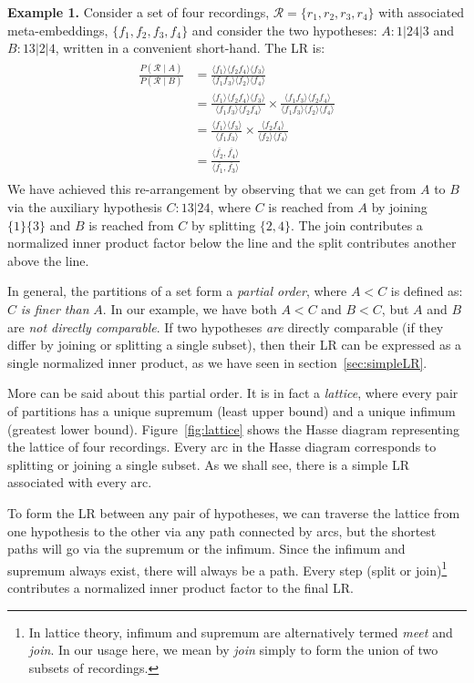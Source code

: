 \documentclass[a4paper,oneside,12pt,english]{report}
\def\expv#1#2{\bigl\langle#1\bigr\rangle_{#2}}
\def\expp#1{\bigl\langle#1\bigr\rangle}
\def\Rset{\mathcal{R}}
\def\dot#1#2{\expv{#1,#2}{}}
\def\normal#1{\overline{#1}}
\def\dotn#1#2{\dot{\normal{#1}}{\normal{#2}}}
\begin{document}
\noindent\textbf{Example 1.} Consider a set of four recordings, $\Rset=\{r_1,r_2,r_3,r_4\}$ with associated meta-embeddings, $\{f_1,f_2,f_3,f_4\}$ and consider the two hypotheses: $A:1|24|3$ and $B:13|2|4$, written in a convenient short-hand. The LR is:
\begin{align}
\begin{split}
\frac{P(\Rset\mid A)}{P(\Rset\mid B)} &= \frac{\expp{f_1}\expp{f_2f_4}\expp{f_3}}{\expp{f_1f_3}\expp{f_2}\expp{f_4}}\\
&= \frac{\expp{f_1}\expp{f_2f_4}\expp{f_3}}{\expp{f_1f_3}\expp{f_2f_4}}\times
\frac{\expp{f_1f_3}\expp{f_2f_4}}{\expp{f_1f_3}\expp{f_2}\expp{f_4}} \\
&= \frac{\expp{f_1}\expp{f_3}}{\expp{f_1f_3}}\times
\frac{\expp{f_2f_4}}{\expp{f_2}\expp{f_4}} \\
&= \frac{\dotn{f_2}{f_4}}{\dotn{f_1}{f_3}}
\end{split}
\end{align} 
We have achieved this re-arrangement by observing that we can get from $A$ to $B$ via the auxiliary hypothesis $C:13|24$, where $C$ is reached from $A$ by joining $\{1\}\{3\}$ and $B$ is reached from $C$ by splitting $\{2,4\}$. The join contributes a normalized inner product factor below the line and the split contributes another above the line.

In general, the partitions of a set form a \emph{partial order}, where $A<C$ is defined as: $C$ \emph{is finer than} $A$. In our example, we have both $A<C$ and $B<C$, but $A$ and $B$ are \emph{not directly comparable}. If two hypotheses \emph{are} directly comparable (if they differ by joining or splitting a single subset), then their LR can be expressed as a single normalized inner product, as we have seen in section~\ref{sec:simpleLR}. 

More can be said about this partial order. It is in fact a \emph{lattice}, where every pair of partitions has a unique supremum (least upper bound) and a unique infimum (greatest lower bound). Figure~\ref{fig:lattice} shows the Hasse diagram representing the lattice of four recordings. Every arc in the Hasse diagram corresponds to splitting or joining a single subset. As we shall see, there is a simple LR associated with every arc. 

To form the LR between any pair of hypotheses, we can traverse the lattice from one hypothesis to the other via any path connected by arcs, but the shortest paths will go via the supremum or the infimum. Since the infimum and supremum always exist, there will always be a path. Every step (split or join)\footnote{In lattice theory, infimum and supremum are alternatively termed \emph{meet} and \emph{join}. In our usage here, we mean by \emph{join} simply to form the union of two subsets of recordings.} contributes a normalized inner product factor to the final LR. 
\end{document}
